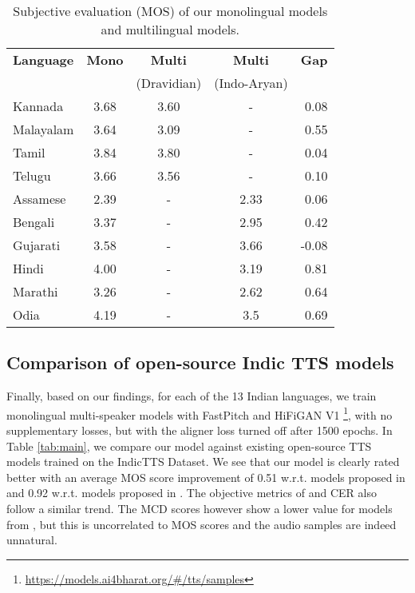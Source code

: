 \documentclass{article}
\begin{document}
\begin{table}[htbp]
\centering
\begingroup
\setlength{\tabcolsep}{6pt} \renewcommand{\arraystretch}{0.9} \begin{tabular}{lcccr}
\toprule
\textbf{Language} & \textbf{Mono} & \textbf{Multi} & \textbf{Multi} & \textbf{Gap} \\
&  & (Dravidian) & (Indo-Aryan) & \\ \midrule
Kannada   & 3.68 & 3.60  & -    & 0.08  \\
Malayalam & 3.64 & 3.09 & -    & 0.55  \\
Tamil     & 3.84 & 3.80  & -    & 0.04  \\
Telugu    & 3.66 & 3.56 & -    & 0.10   \\ \midrule
Assamese  & 2.39 & -    & 2.33 & 0.06  \\

Bengali   & 3.37 & -    & 2.95 & 0.42  \\
Gujarati  & 3.58 & -    & 3.66 & -0.08 \\
Hindi     & 4.00    & -    & 3.19 & 0.81  \\
Marathi   & 3.26 & -    & 2.62 & 0.64  \\
Odia      & 4.19 & -    & 3.5  & 0.69   \\ \bottomrule
\end{tabular}
\endgroup
\caption{Subjective evaluation (MOS) of our monolingual models and multilingual models.}
\label{tab:multilingual}
\end{table}

\subsection{Comparison of open-source Indic TTS models}
\label{subsec:best}
Finally, based on our findings, for each of the 13 Indian languages, we train monolingual multi-speaker models with FastPitch and HiFiGAN V1 \footnote{\scriptsize \url{https://models.ai4bharat.org/\#/tts/samples}}, with no supplementary losses, but with the aligner loss turned off after 1500 epochs. 
In Table \ref{tab:main}, we compare our model against existing open-source TTS models trained on the IndicTTS Dataset.
We see that our model is clearly rated better with an average MOS score improvement of 0.51 w.r.t. models proposed in \cite{prakash2020generic} and 0.92 w.r.t. models proposed in \cite{vakyansh2021glow}.
The objective metrics of  and CER also follow a similar trend. 
The MCD scores however show a lower value for models from \cite{vakyansh2021glow}, but this is uncorrelated to MOS scores \cite{salesky2021assessing} and the audio samples are indeed unnatural.
\end{document}
